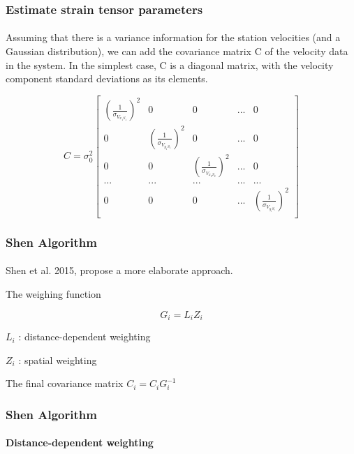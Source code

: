 \begin{frame}
 \frametitle{Estimate strain tensor parameters}
 \framesubtitle{}
 \label{ch2:}
 
 Assuming that there is a variance information for the station velocities (and a Gaussian distribution), we can add the covariance matrix C  of the velocity data in the system. In the simplest case, C is a diagonal matrix, with the velocity component standard deviations as its elements.
 
 \[
 C = \sigma_{0}^{2} 
 \begin{bmatrix}
 (\frac{1}{\sigma_{V_{x_{1}S_{1}}}})^{2} & 0 & 0  & ... & 0\\
 0 & (\frac{1}{\sigma_{V_{y_{1}S_{1}}}})^{2} & 0  & ... & 0\\
 0 & 0 & ({\frac{1}{\sigma_{V_{x_{2}S_{2}}}}})^{2} & ... & 0\\
 ... &  ... & ... & ... & ...\\
 0 & 0 & 0 & ... & (\frac{1}{\sigma_{V_{y_{i}S_{i}}}})^{2}\\
 \end{bmatrix}
 \]

\end{frame}
\note{}


\begin{frame}
 \frametitle{Shen Algorithm}
 \framesubtitle{}
 \label{ch2:}
 
 Shen et al. 2015, propose a more elaborate approach.
 
 The weighing function
 
 \[ G_{i} = L_{i} Z_{i}  \]
 
 $ L_{i} $ : distance-dependent weighting
 
 $ Z_{i} $ : spatial weighting
 
 The final covariance matrix $ C_{i} = C_{i}G_{i}^{-1} $

\end{frame}
\note{}


\begin{frame}
 \frametitle{Shen Algorithm}
 \framesubtitle{Distance-dependent weighting}
 \label{ch2:}

\end{frame}
\note{}

